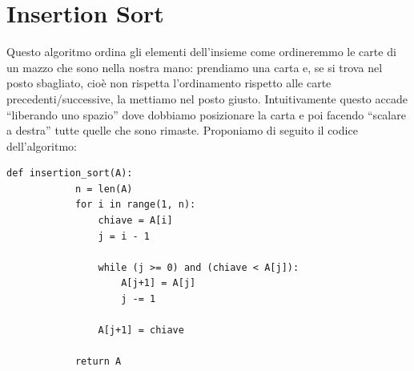 \documentclass[12pt]{report}
\begin{document}
    \section{Insertion Sort}
    Questo algoritmo ordina gli elementi dell’insieme come ordineremmo le carte di un mazzo che sono nella nostra mano: prendiamo una carta e, se si trova nel posto sbagliato, cioè non rispetta l’ordinamento rispetto alle carte precedenti/successive, la mettiamo nel posto giusto. Intuitivamente questo accade “liberando uno spazio” dove dobbiamo posizionare la carta e poi facendo “scalare a destra” tutte quelle che sono rimaste.
    Proponiamo di seguito il codice dell’algoritmo:
    		
    \begin{lstlisting}[caption={Insertion Sort}]
    	def insertion_sort(A):
    		n = len(A)
    		for i in range(1, n):
    			chiave = A[i]
    			j = i - 1
    			
    			while (j >= 0) and (chiave < A[j]):
    				A[j+1] = A[j]
    				j -= 1
    			
    			A[j+1] = chiave
    			
    		return A
    \end{lstlisting}
    		
\end{document}
